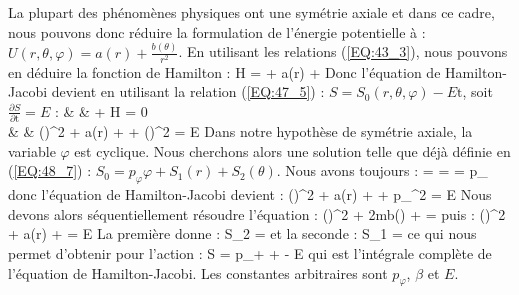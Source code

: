 La plupart des ph\'{e}nom\`{e}nes physiques ont une sym\'{e}trie axiale et dans ce cadre, nous pouvons donc r\'{e}duire la formulation de l'\'{e}nergie potentielle \`{a} : $U(r,\theta,\varphi) = a(r) + \frac{b(\theta)}{r^{2}}$. En utilisant les relations (\ref{EQ:43_3}), nous pouvons en d\'{e}duire la fonction de Hamilton :
\benn
	H =  + a(r) + 
\eenn
Donc l'\'{e}quation de Hamilton-Jacobi devient en utilisant la relation (\ref{EQ:47_5}) : $S = S_{0}(r,\theta,\varphi) - E\mathrm{t}$, soit $\frac{\partial S}{\partial\mathrm{t}} = E$ :
\bea
	& &  + H = 0 \nonumber \\
	& \Leftrightarrow & \left(\right)^{2} + a(r) +  + \left(\right)^{2} = E \nonumber
\eea
Dans notre hypoth\`{e}se de sym\'{e}trie axiale, la variable $\varphi$ est cyclique. Nous cherchons alors une solution telle que d\'{e}j\`{a} d\'{e}finie en (\ref{EQ:48_7}) : $S_{0} = p_{\varphi}\varphi + S_{1}(r) + S_{2}(\theta)$. Nous avons toujours :
\benn
	 = \text{, } =  = p_{\varphi}
\eenn
donc l'\'{e}quation de Hamilton-Jacobi devient :
\benn
	\left(\right)^{2} + a(r) +  + p_{\varphi}^{2} = E
\eenn
Nous devons alors s\'{e}quentiellement r\'{e}soudre l'\'{e}quation :
\benn
	\left(\right)^{2} + 2mb(\theta) +  = \beta
\eenn
puis :
\benn
	\left(\right)^{2} + a(r) +  = E
\eenn
La premi\`{e}re donne :
\benn
	S_{2} = 
\eenn
et la seconde :
\benn
	S_{1} = 
\eenn
ce qui nous permet d'obtenir pour l'action :
\be
	S = p_{\varphi}\varphi +  +  - E \label{EQ:48_9}
\ee
qui est l'int\'{e}grale compl\`{e}te de l'\'{e}quation de Hamilton-Jacobi. Les constantes arbitraires sont $p_{\varphi}$, $\beta$ et $E$.

